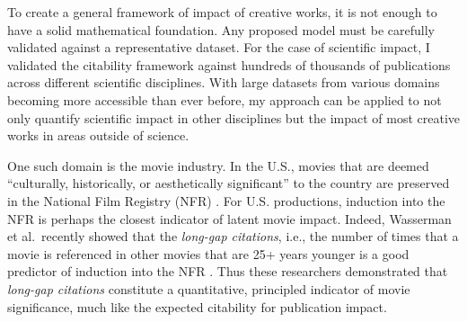 To create a general framework of impact of creative works, it is not enough to have a solid mathematical foundation. Any proposed model must be carefully validated against a representative dataset. For the case of scientific impact, I validated the citability framework against hundreds of thousands of publications across different scientific disciplines. With large datasets from various domains becoming more accessible than ever before, my approach can be applied to not only quantify scientific impact in other disciplines but the impact of most creative works in areas outside of science.

One such domain is the movie industry. In the U.S., movies that are deemed ``culturally, historically, or aesthetically significant'' to the country are preserved in the National Film Registry (NFR) \cite{Congress2017}. For U.S. productions, induction into the NFR is perhaps the closest indicator of latent movie impact. Indeed, Wasserman et al.\ recently showed that the \textit{long-gap citations}, i.e., the number of times that a movie is referenced in other movies that are 25+ years younger is a good predictor of induction into the NFR \cite{Wasserman2015}. Thus these researchers demonstrated that \textit{long-gap citations} constitute a quantitative, principled indicator of movie significance, much like the expected citability for publication impact.
